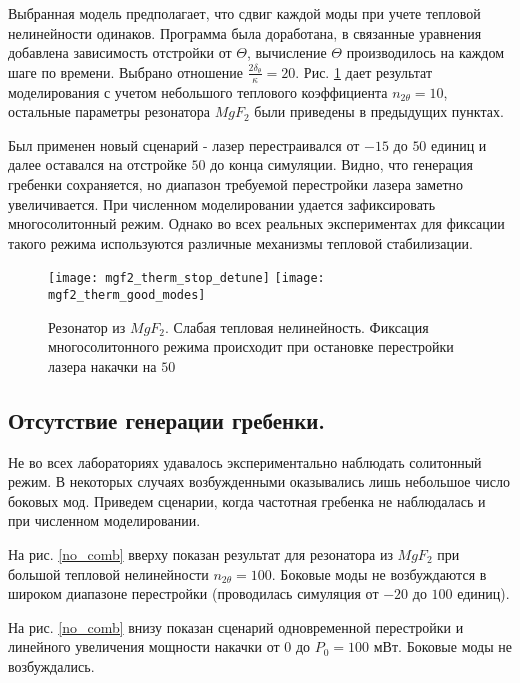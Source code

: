 Выбранная модель предполагает, что сдвиг каждой моды при учете тепловой нелинейности одинаков. Программа была доработана, в связанные уравнения добавлена зависимость отстройки от $\Theta$, вычисление $\Theta$ производилось на каждом шаге по времени. Выбрано отношение $\frac{2\delta_\theta}{\kappa}=20$.  Рис. \ref{therm} дает результат моделирования с учетом небольшого теплового коэффициента $n_{2\theta}=10$, остальные параметры резонатора $MgF_2$ были приведены в предыдущих пунктах.

Был применен новый сценарий - лазер перестраивался от $-15$ до $50$ единиц и далее оставался на отстройке $50$ до конца симуляции. Видно, что генерация гребенки сохраняется, но диапазон требуемой перестройки лазера заметно увеличивается. При численном моделировании удается зафиксировать многосолитонный режим. Однако во всех реальных экспериментах для фиксации такого режима используются различные механизмы тепловой стабилизации.

\begin{figure}
  \texttt{[image: mgf2\_therm\_stop\_detune]}
  \texttt{[image: mgf2\_therm\_good\_modes]}
  \caption{Резонатор из $MgF_2$. Слабая тепловая нелинейность. Фиксация многосолитонного режима происходит при остановке перестройки лазера накачки на $50$} \label{therm}
\end{figure}

\subsection{Отсутствие генерации гребенки.}
Не во всех лабораториях удавалось экспериментально наблюдать солитонный режим. В некоторых случаях возбужденными оказывались лишь небольшое число боковых мод. Приведем сценарии, когда частотная гребенка не наблюдалась и при численном моделировании.

На рис. \ref{no_comb} вверху показан результат для резонатора из $MgF_2$ при большой тепловой нелинейности $n_{2\theta}=100$. Боковые моды не возбуждаются в широком диапазоне перестройки (проводилась симуляция от $-20$ до $100$ единиц).

На рис. \ref{no_comb} внизу показан сценарий одновременной перестройки и линейного увеличения мощности накачки от 0 до $P_0=100$ мВт. Боковые моды не возбуждались.

